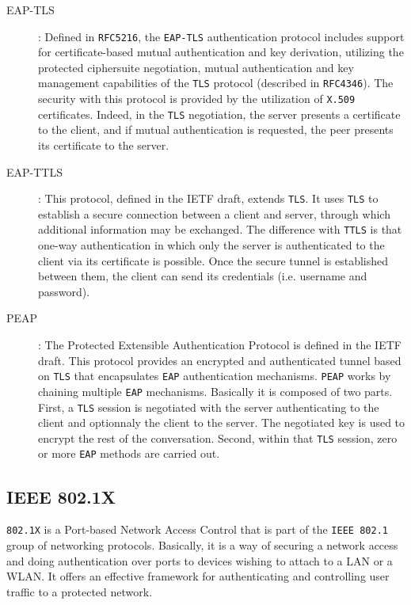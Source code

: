 \begin{description}
	\item [EAP-TLS]: Defined in \texttt{RFC5216}\cite{rfc5216}, the \texttt{EAP-TLS} authentication protocol includes support for certificate-based mutual authentication and key derivation, utilizing the protected ciphersuite negotiation, mutual authentication and key management capabilities of the \texttt{TLS} protocol (described in \texttt{RFC4346}\cite{rfc4346}). The security with this protocol is provided by the utilization of \texttt{X.509} certificates. Indeed, in the \texttt{TLS} negotiation, the server presents a certificate to the client, and if mutual authentication is requested, the peer presents its certificate to the server.
	\item [EAP-TTLS]: This protocol, defined in the IETF draft\cite{ttls-draft}, extends \texttt{TLS}. It uses \texttt{TLS} to establish a secure connection between a client and server, through which additional information may be exchanged. The difference with \texttt{TTLS} is that one-way authentication in which only the server is authenticated to the client via its certificate is possible. Once the secure tunnel is established between them, the client can send its credentials (i.e. username and password).
	\item [PEAP]: The Protected Extensible Authentication Protocol is defined in the IETF draft\cite{peap-draft}. This protocol provides an encrypted and authenticated tunnel based on \texttt{TLS} that encapsulates \texttt{EAP} authentication mechanisms. \texttt{PEAP} works by chaining multiple \texttt{EAP} mechanisms. Basically it is composed of two parts. First, a \texttt{TLS} session is negotiated with the server authenticating to the client and optionnaly the client to the server. The negotiated key is used to encrypt the rest of the conversation. Second, within that \texttt{TLS} session, zero or more \texttt{EAP} methods are carried out.
\end{description}


\subsection{IEEE 802.1X}
\texttt{802.1X} is a Port-based Network Access Control that is part of the \texttt{IEEE 802.1} group of networking protocols. Basically, it is a way of securing a network access and doing authentication over ports to devices wishing to attach to a LAN or a WLAN. It offers an effective framework for authenticating and controlling user traffic to a protected network.


